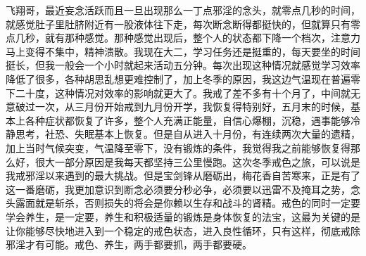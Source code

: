 \begin{case}
    飞翔哥，最近妄念活跃而且一旦出现那么一丁点邪淫的念头，就零点几秒的时间，就感觉肚子里肚脐附近有一股液体往下走，每次断念断得都挺快的，但就算只有零点几秒，就有那种感觉。那种感觉出现后，整个人的状态都下降一个档次，注意力马上变得不集中，精神溃散。我现在大二，学习任务还是挺重的，每天要坐的时间挺长，但我一般会一个小时就起来活动五分钟。每次出现这种情况就感觉学习效率降低了很多，各种胡思乱想更难控制了，加上冬季的原因，我这边气温现在普遍零下二十度，这种情况对效率的影响就更大了。我戒了差不多有十个月了，中间就无意破过一次，从三月份开始戒到九月份开学，我恢复得特别好，五月末的时候，基本上各种症状都恢复了许多，整个人充满正能量，自信心爆棚，沉稳，遇事能够冷静思考，社恐、失眠基本上恢复。但是自从进入十月份，有连续两次大量的遗精，加上当时气候突变，气温降至零下，没有锻炼的条件，我觉得我之前能够恢复得那么好，很大一部分原因是我每天都坚持三公里慢跑。这次冬季戒色之旅，可以说是我戒邪淫以来遇到的最大挑战。但是宝剑锋从磨砺出，梅花香自苦寒来，正是有了这一番磨砺，我更加意识到断念必须要分秒必争，必须要以迅雷不及掩耳之势，念头露面就是斩杀，否则损失的将会是你赖以生存和战斗的肾精。戒色的同时一定要学会养生，是一定要，养生和积极适量的锻炼是身体恢复的法宝，这最为关键的是让你能够尽快地进入到一个稳定的戒色状态，进入良性循环，只有这样，彻底戒除邪淫才有可能。戒色、养生，两手都要抓，两手都要硬。


\end{case}

